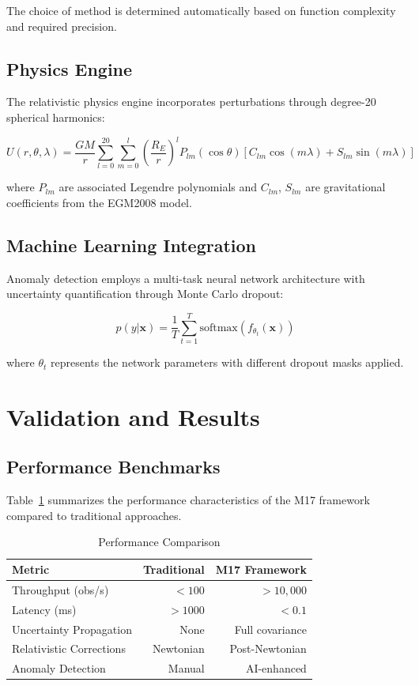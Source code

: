 \documentclass[twocolumn]{article}
\newcommand{\vect}[1]{\boldsymbol{#1}}
\begin{document}
The choice of method is determined automatically based on function complexity and required precision.

\subsection{Physics Engine}

The relativistic physics engine incorporates perturbations through degree-20 spherical harmonics:

\begin{equation}
U(r,\theta,\lambda) = \frac{GM}{r}\sum_{l=0}^{20}\sum_{m=0}^{l}\left(\frac{R_E}{r}\right)^l P_{lm}(\cos\theta)[C_{lm}\cos(m\lambda) + S_{lm}\sin(m\lambda)]
\label{eq:gravity_field}
\end{equation}

where $P_{lm}$ are associated Legendre polynomials and $C_{lm}$, $S_{lm}$ are gravitational coefficients from the EGM2008 model.

\subsection{Machine Learning Integration}

Anomaly detection employs a multi-task neural network architecture with uncertainty quantification through Monte Carlo dropout:

\begin{equation}
p(y|\vect{x}) = \frac{1}{T}\sum_{t=1}^{T} \text{softmax}(f_{\theta_t}(\vect{x}))
\label{eq:mc_dropout}
\end{equation}

where $\theta_t$ represents the network parameters with different dropout masks applied.

\section{Validation and Results}

\subsection{Performance Benchmarks}

Table~\ref{tab:performance} summarizes the performance characteristics of the M17 framework compared to traditional approaches.

\begin{table}[ht]
\centering
\caption{Performance Comparison}
\label{tab:performance}
\begin{tabular}{@{}lrr@{}}
\toprule
Metric & Traditional & M17 Framework \\
\midrule
Throughput (obs/s) & $<100$ & $>10,000$ \\
Latency (ms) & $>1000$ & $<0.1$ \\
Uncertainty Propagation & None & Full covariance \\
Relativistic Corrections & Newtonian & Post-Newtonian \\
Anomaly Detection & Manual & AI-enhanced \\
\bottomrule
\end{tabular}
\end{table}
\end{document}
